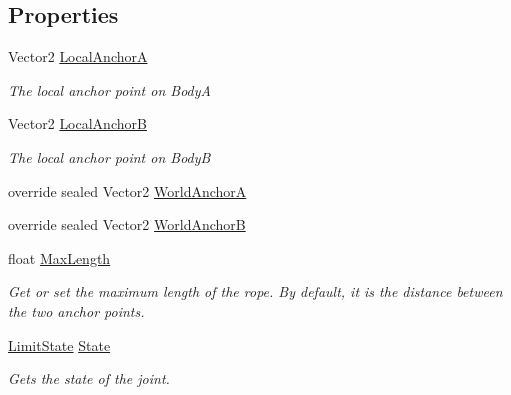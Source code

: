 \subsection*{Properties}
\begin{DoxyCompactItemize}
\item 
Vector2 \hyperlink{class_farseer_physics_1_1_dynamics_1_1_joints_1_1_rope_joint_a8f5c84a045c5a3e48fe46c0a949c61f5}{Local\+Anchor\+A}
\begin{DoxyCompactList}\small\item\em The local anchor point on Body\+A \end{DoxyCompactList}\item 
Vector2 \hyperlink{class_farseer_physics_1_1_dynamics_1_1_joints_1_1_rope_joint_ad40a4d81d4f0ed393fd4dbd0e90cf683}{Local\+Anchor\+B}
\begin{DoxyCompactList}\small\item\em The local anchor point on Body\+B \end{DoxyCompactList}\item 
override sealed Vector2 \hyperlink{class_farseer_physics_1_1_dynamics_1_1_joints_1_1_rope_joint_a49ea5fcddd32174e4170ce8346ca8ff0}{World\+Anchor\+A}
\item 
override sealed Vector2 \hyperlink{class_farseer_physics_1_1_dynamics_1_1_joints_1_1_rope_joint_a6575449f9b5d1775d3e23b8251e1c1cd}{World\+Anchor\+B}
\item 
float \hyperlink{class_farseer_physics_1_1_dynamics_1_1_joints_1_1_rope_joint_a59a02f46e4bc67c7d640c0c3c4d2667b}{Max\+Length}
\begin{DoxyCompactList}\small\item\em Get or set the maximum length of the rope. By default, it is the distance between the two anchor points. \end{DoxyCompactList}\item 
\hyperlink{namespace_farseer_physics_1_1_dynamics_1_1_joints_a31a093d39ac5f01671837f083d915a35}{Limit\+State} \hyperlink{class_farseer_physics_1_1_dynamics_1_1_joints_1_1_rope_joint_a185d4fe67134b08e33113cf5f321d4ba}{State}
\begin{DoxyCompactList}\small\item\em Gets the state of the joint. \end{DoxyCompactList}\end{DoxyCompactItemize}
